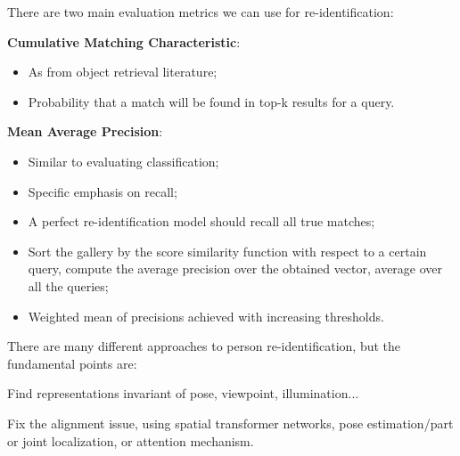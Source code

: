 There are two main evaluation metrics we can use for re-identification:
\begin{myitem}
    \item \textbf{Cumulative Matching Characteristic}:
    \begin{itemize}
        \item As from object retrieval literature;
        \item Probability that a match will be found in top-k results for a query.
    \end{itemize}
    \item \textbf{Mean Average Precision}:
    \begin{itemize}
        \item Similar to evaluating classification;
        \item Specific emphasis on recall;
        \item A perfect re-identification model should recall all true matches;
        \item Sort the gallery by the score similarity function with respect to a certain query, compute the average precision over the obtained vector, average over all the queries;
        \item Weighted mean of precisions achieved with increasing thresholds.
    \end{itemize}
\end{myitem}

There are many different approaches to person re-identification, but the fundamental points are:
\begin{myitem}
    \item Find representations invariant of pose, viewpoint, illumination...
    \item Fix the alignment issue, using spatial transformer networks, pose estimation/part or joint localization, or attention mechanism.
\end{myitem}

